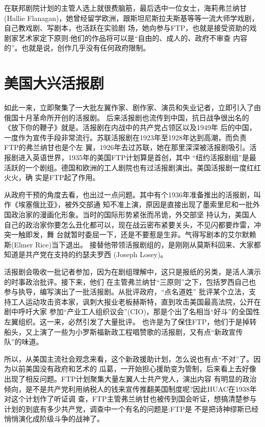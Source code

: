 \documentclass[10pt]{article}
\begin{document}
{在联邦剧院计划的主管人选上就很费脑筋，最后选中一位女士，海莉\textperiodcentered 弗兰纳甘(Hallie
Flanagan)，她曾经留学欧洲，跟斯坦尼斯拉夫斯基等等一流大师学戏剧，自己教戏剧、写剧本，也活跃在实验剧
场，她向参与FTP，也就是接受资助的戏剧家艺术家定下原则:他们的作品将可以是``自由的、成人的、政府不审查
内容的''。也就是说，创作几乎没有任何政府限制。

\pagebreak
\section{美国大兴活报剧}

如此一来，立即聚集了一大批左翼作家、剧作家、演员和失业记者，立即引入了由俄国十月革命所开创的活报剧。
后来活报剧也流传到中国，抗日战争很出名的《放下你的鞭子》就是。活报剧在内战中的共产党占领区以及1949年
后的中国，一度作为宣传手段非常流行。苏联活报剧在1923年至1928年达到高潮，而负责FTP的弗兰纳甘也是个左
翼，1926年去过苏联，她在那里深深被活报剧吸引。活报剧进入英语世界，1935年的美国FTP计划算是首创，其中
``纽约活报剧组''是最活跃的一个剧组。德国和欧洲的工人剧院也有过活报剧演出。美国活报剧一度红红火火，确
实是FTP起了作用。

从政府干预的角度去看，也出过一点问题。其中有个1936年准备推出的活报剧，叫作《埃塞俄比亚》，被外交部通
知不准上演，原因是直接出现了墨索里尼和一批外国政治家的漫画化形象。当时的国际形势紧张而吊诡，外交部坚
持认为，美国人自己的政治家你要怎么丑化都可以，现在战云密布紧要关头，不见闪都要炸雷，冲突一触即发，舞
台就暂时委屈一下，还是不要惹是生非。气得写剧本的艾尔默\textperiodcentered 赖斯(Elmer Rice)当下退出。
接替他带领活报剧组的，是刚刚从莫斯科回来、大家都知道是共产党在支持的约瑟夫\textperiodcentered 罗西
(Joseph Losey)。

活报剧会吸收一批记者参加，因为在剧组理解中，这只是报纸的另类，是活人演示的时事政治批评。接下来，他们
在主管弗兰纳甘``三原则''之下，包括罗西自己也参与执导，编写演出了一批活报剧。从批评政府，``点名道姓''
批评某个立法，支持工人运动攻击资本家，讽刺大报业老板赫斯特，直到攻击美国最高法院，公开在剧中呼吁大家
参加``产业工人组织议会''(CIO)，那是个出了名相当``好斗''的全国性左翼组织。这一来，必然引发了大量批评。
也许是为了保住FTP，他们于是掉转船头，又上演了一些为小罗斯福新政工程唱赞歌的活报剧，又有点``新政宣传
队''的味道。

所以，从美国主流社会观念来看，这个新政援助计划，怎么说也有点``不对''了。因为以前美国没有政府和艺术的
瓜葛，一开始担心援助变为管制，后来看上去好像出现了相反问题。FTP计划聚集大量左翼人士共产党人，演出内容
有明显的政治倾向，是不是共产党利用纳税人的钱来宣传推翻美国制度呢?因此HUAC在1938年对这个计划作了听证调
查，FTP主管弗兰纳甘也被传到国会听证，想搞清楚参与计划的到底有多少共产党，调查中一个有名的问题是:FTP是
不是把诗神缪斯已经悄悄演化成阶级斗争的战神了。

}
\end{document}
